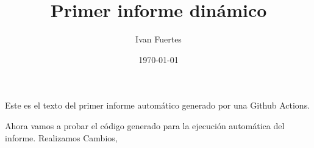 \documentclass[12pt, a4paper]{book}
\title{Primer informe dinámico}
\author{Ivan Fuertes}
\date{\today}
\begin{document}
\maketitle

Este es el texto del primer informe automático generado por una Github Actions.\newline

Ahora vamos a probar el código generado para la ejecución automática del informe. Realizamos Cambios,
\end{document}
